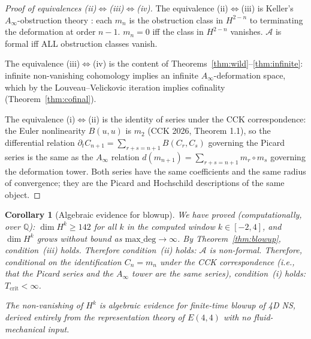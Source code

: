 \documentclass[reqno,10pt]{amsart}
\theoremstyle{plain}
\newtheorem{corollary}[theorem]{Corollary}
\theoremstyle{definition}
\def\gE{E(4,4)}
\begin{document}
\begin{proof}[Proof of equivalences (ii)$\Leftrightarrow$(iii)$\Leftrightarrow$(iv)]
  The equivalence (ii)$\Leftrightarrow$(iii) is Keller's $A_\infty$-obstruction
  theory \cite{Keller2001}: each $m_n$ is the obstruction class in $H^{2-n}$
  to terminating the deformation at order $n-1$.  $m_n = 0$ iff the class
  in $H^{2-n}$ vanishes.  $\mathcal{A}$ is formal iff ALL obstruction classes
  vanish.

  The equivalence (iii)$\Leftrightarrow$(iv) is the content of
  Theorems~\ref{thm:wild}--\ref{thm:infinite}: infinite non-vanishing cohomology
  implies an infinite $A_\infty$-deformation space, which by the
  Louveau--Velickovic iteration implies cofinality
  (Theorem~\ref{thm:cofinal}).

  The equivalence (i)$\Leftrightarrow$(ii) is the identity of series under
  the CCK correspondence: the Euler nonlinearity $B(u,u)$ is $m_2$ (CCK
  2026, Theorem 1.1), so the differential relation
  $\partial_t C_{n+1} = \sum_{r+s=n+1} B(C_r, C_s)$ governing the Picard
  series is the same as the $A_\infty$ relation
  $d(m_{n+1}) = \sum_{r+s=n+1} m_r \circ m_s$ governing the deformation
  tower.  Both series have the same coefficients and the same radius of
  convergence; they are the Picard and Hochschild descriptions of the same
  object.
\end{proof}

\begin{corollary}[Algebraic evidence for blowup]\label{cor:blowup}
  We have proved (computationally, over $\mathbb{Q}$):
  $\dim H^k \geq 142$ for all $k$ in the computed window $k \in [-2,4]$,
  and $\dim H^k$ grows without bound as $\mathrm{max\_deg} \to \infty$.
  By Theorem~\ref{thm:blowup}, condition~(iii) holds.
  Therefore condition~(ii) holds: $\mathcal{A}$ is non-formal.
  Therefore, conditional on the identification $C_n = m_n$ under the CCK
  correspondence (i.e., that the Picard series and the $A_\infty$ tower
  are the same series), condition~(i) holds: $T_{\mathrm{crit}} < \infty$.

  The non-vanishing of $H^k$ is \emph{algebraic evidence for finite-time
  blowup of 4D NS}, derived entirely from the representation theory of
  $\gE$ with no fluid-mechanical input.
\end{corollary}
\end{document}
